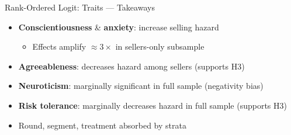 \documentclass{beamer}
\begin{document}
\begin{frame}{Rank-Ordered Logit: Traits --- Takeaways}
\begin{itemize}
    \item \textbf{Conscientiousness} \& \textbf{anxiety}: increase selling hazard
    \begin{itemize}
        \item Effects amplify $\approx 3\times$ in sellers-only subsample
    \end{itemize}
    \item \textbf{Agreeableness}: decreases hazard among sellers (supports H3)
    \item \textbf{Neuroticism}: marginally significant in full sample (negativity bias)
    \item \textbf{Risk tolerance}: marginally decreases hazard in full sample (supports H3)
    \item Round, segment, treatment absorbed by strata
\end{itemize}

\vspace{0.3cm}
\begin{center}
\end{center}
\end{frame}


\end{document}
